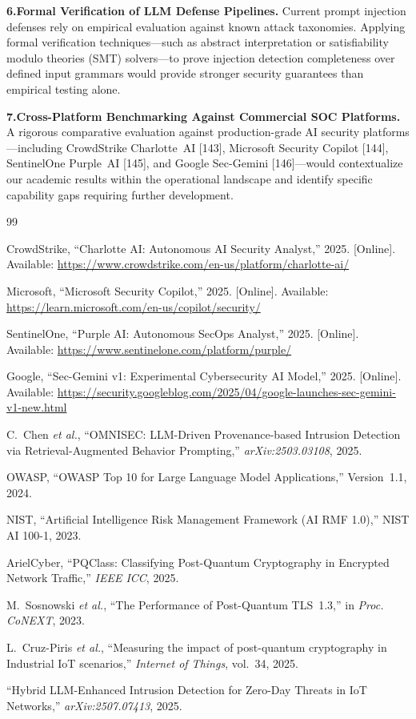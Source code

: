 \textbf{6.\;Formal Verification of LLM Defense Pipelines.} Current prompt
injection defenses rely on empirical evaluation against known attack
taxonomies. Applying formal verification techniques---such as abstract
interpretation or satisfiability modulo theories (SMT) solvers---to prove
injection detection completeness over defined input grammars would provide
stronger security guarantees than empirical testing alone.

\textbf{7.\;Cross-Platform Benchmarking Against Commercial SOC Platforms.}
A rigorous comparative evaluation against production-grade AI security
platforms---including CrowdStrike Charlotte~AI [143], Microsoft Security
Copilot [144], SentinelOne Purple~AI [145], and Google
Sec-Gemini [146]---would contextualize our academic results within the
operational landscape and identify specific capability gaps requiring
further development.


\begin{thebibliography}{99}

CrowdStrike, ``Charlotte AI: Autonomous AI Security Analyst,'' 2025.
[Online]. Available:
\url{https://www.crowdstrike.com/en-us/platform/charlotte-ai/}

Microsoft, ``Microsoft Security Copilot,'' 2025. [Online]. Available:
\url{https://learn.microsoft.com/en-us/copilot/security/}

SentinelOne, ``Purple AI: Autonomous SecOps Analyst,'' 2025. [Online].
Available: \url{https://www.sentinelone.com/platform/purple/}

Google, ``Sec-Gemini v1: Experimental Cybersecurity AI Model,'' 2025.
[Online]. Available:
\url{https://security.googleblog.com/2025/04/google-launches-sec-gemini-v1-new.html}

C.~Chen \textit{et al.}, ``OMNISEC: LLM-Driven Provenance-based Intrusion
Detection via Retrieval-Augmented Behavior Prompting,''
\textit{arXiv:2503.03108}, 2025.

OWASP, ``OWASP Top 10 for Large Language Model Applications,'' Version~1.1,
2024.

NIST, ``Artificial Intelligence Risk Management Framework (AI RMF 1.0),''
NIST AI 100-1, 2023.

ArielCyber, ``PQClass: Classifying Post-Quantum Cryptography in Encrypted
Network Traffic,'' \textit{IEEE ICC}, 2025.

M.~Sosnowski \textit{et al.}, ``The Performance of Post-Quantum TLS~1.3,''
in \textit{Proc. CoNEXT}, 2023.

L.~Cruz-Piris \textit{et al.}, ``Measuring the impact of post-quantum
cryptography in Industrial IoT scenarios,'' \textit{Internet of Things},
vol.~34, 2025.

``Hybrid LLM-Enhanced Intrusion Detection for Zero-Day Threats in IoT
Networks,'' \textit{arXiv:2507.07413}, 2025.

\end{thebibliography}


